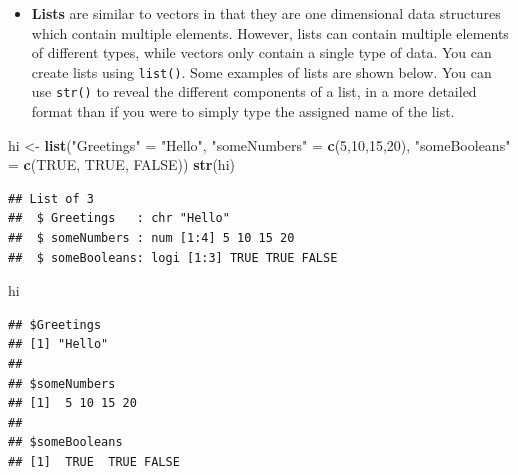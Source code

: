 \documentclass[
]{book}
\newenvironment{Shaded}{\begin{snugshade}}{\end{snugshade}}
\newcommand{\ConstantTok}[1]{\textcolor[rgb]{0.56,0.35,0.01}{#1}}
\newcommand{\DecValTok}[1]{\textcolor[rgb]{0.00,0.00,0.81}{#1}}
\newcommand{\FunctionTok}[1]{\textcolor[rgb]{0.13,0.29,0.53}{\textbf{#1}}}
\newcommand{\NormalTok}[1]{#1}
\newcommand{\OtherTok}[1]{\textcolor[rgb]{0.56,0.35,0.01}{#1}}
\newcommand{\SpecialCharTok}[1]{\textcolor[rgb]{0.81,0.36,0.00}{\textbf{#1}}}
\newcommand{\StringTok}[1]{\textcolor[rgb]{0.31,0.60,0.02}{#1}}
\providecommand{\tightlist}{%
  \setlength{\itemsep}{0pt}\setlength{\parskip}{0pt}}
\begin{document}
\begin{itemize}
\tightlist
\item
  \textbf{Lists} are similar to vectors in that they are one dimensional data structures which contain multiple elements. However, lists can contain multiple elements of different types, while vectors only contain a single type of data. You can create lists using \texttt{list()}. Some examples of lists are shown below. You can use \texttt{str()} to reveal the different components of a list, in a more detailed format than if you were to simply type the assigned name of the list.
\end{itemize}

\begin{Shaded}
\begin{Highlighting}[]
\NormalTok{hi }\OtherTok{\textless{}{-}} \FunctionTok{list}\NormalTok{(}\StringTok{"Greetings"} \OtherTok{=} \StringTok{"Hello"}\NormalTok{, }\StringTok{"someNumbers"} \OtherTok{=} \FunctionTok{c}\NormalTok{(}\DecValTok{5}\NormalTok{,}\DecValTok{10}\NormalTok{,}\DecValTok{15}\NormalTok{,}\DecValTok{20}\NormalTok{), }\StringTok{"someBooleans"} \OtherTok{=} \FunctionTok{c}\NormalTok{(}\ConstantTok{TRUE}\NormalTok{, }\ConstantTok{TRUE}\NormalTok{, }\ConstantTok{FALSE}\NormalTok{))}
\FunctionTok{str}\NormalTok{(hi)}
\end{Highlighting}
\end{Shaded}

\begin{verbatim}
## List of 3
##  $ Greetings   : chr "Hello"
##  $ someNumbers : num [1:4] 5 10 15 20
##  $ someBooleans: logi [1:3] TRUE TRUE FALSE
\end{verbatim}

\begin{Shaded}
\begin{Highlighting}[]
\NormalTok{hi}
\end{Highlighting}
\end{Shaded}

\begin{verbatim}
## $Greetings
## [1] "Hello"
## 
## $someNumbers
## [1]  5 10 15 20
## 
## $someBooleans
## [1]  TRUE  TRUE FALSE
\end{verbatim}

\begin{Shaded}
\end{Shaded}
\end{document}
